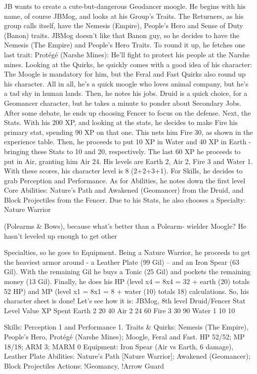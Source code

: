 \begin{multicols}{2}
\begin{mog}
JB wants to create a cute-but-dangerous Geodancer
moogle. He begins with his name, of course JBMog, and
looks at his Group's Traits. The Returners, as his group
calls itself, have the Nemesis (Empire), People's Hero and
Sense of Duty (Banon) traits. JBMog doesn't like that
Banon guy, so he decides to have the Nemesis (The
Empire) and People's Hero Traits. To round it up, he
fetches one last trait: Protégé (Narshe Mines): He'll fight
to protect his people at the Narshe mines.
Looking at the Quirks, he quickly comes with a
good idea of his character: The Moogle is mandatory for
him, but the Feral and Fast Quirks also round up his
character. All in all, he's a quick moogle who loves animal
company, but he's a tad shy in human lands.
Then, he notes his jobs. Druid is a quick choice,
for a Geomancer character, but he takes a minute to
ponder about Secondary Jobs. After some debate, he ends
up choosing Fencer to focus on the defense.
Next, the Stats. With his 200 XP, and looking at
the stats, he decides to make Fire his primary stat,
spending 90 XP on that one. This nets him Fire 30, as
shown in the experience table. Then, he proceeds to put
10 XP in Water and 40 XP in Earth - bringing these Stats
to 10 and 20, respectively. The last 60 XP he proceeds to
put in Air, granting him Air 24. His levels are Earth 2, Air
2, Fire 3 and Water 1. With these scores, his character
level is 8 (2+2+3+1). For Skills, he decides to grab
Perception and Performance.
As for Abilities, he notes down the first level Core
Abilities: Nature's Path and Awakened (Geomancer) from
the Druid, and Block Projectiles from the Fencer. Due to
his Stats, he also chooses a Specialty: Nature Warrior

(Polearms \& Bows), because what’s better than a Polearm-
wielder Moogle? He hasn't leveled up enough to get other

Specialties, so he goes to Equipment.
Being a Nature Warrior, he proceeds to get the
heaviest armor around - a Leather Plate (99 Gil) – and an
Iron Spear (63 Gil). With the remaining Gil he buys a
Tonic (25 Gil) and pockets the remaining money (13 Gil).
Finally, he does his HP (level x4 = 8x4 = 32 + earth (20)
totals 52 HP) and MP (level x1 = 8x1 = 8 + water (10)
totals 18) calculations.
So, his character sheet is done! Let's see how it is:
JBMog, 8th level Druid/Fencer
Stat Level Value XP Spent
Earth 2 20 40
Air 2 24 60
Fire 3 30 90
Water 1 10 10

Skills: Perception 1 and Performance 1.
Traits \& Quirks: Nemesis (The Empire), People's Hero,
Protégé (Narshe Mines); Moogle, Feral and Fast.
HP 52/52; MP 18/18; ARM 3; MARM 0
Equipment: Iron Spear (Air vs Earth, 6 damage), Leather
Plate
Abilities: Nature's Path [Nature Warrior]; Awakened
(Geomancer); Block Projectiles
Actions: !Geomancy, !Arrow Guard
\end{mog}
\end{multicols}